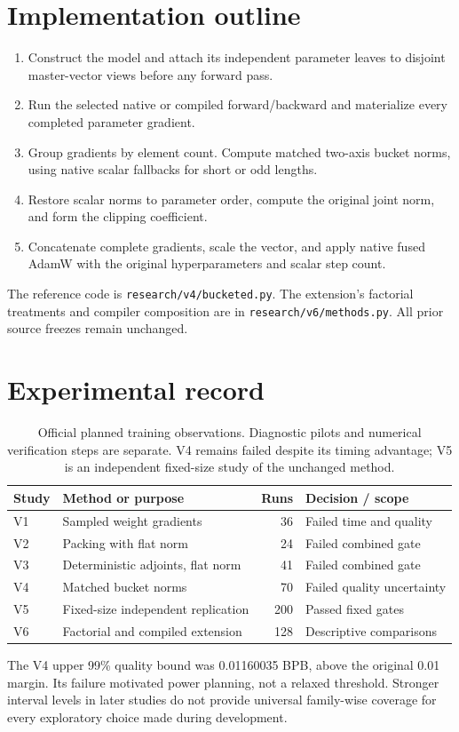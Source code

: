 \documentclass[11pt]{article}
\newcommand{\code}[1]{\texttt{#1}}
\begin{document}
\section{Implementation outline}
\begin{enumerate}
\item Construct the model and attach its independent parameter leaves to
disjoint master-vector views before any forward pass.
\item Run the selected native or compiled forward/backward and materialize
every completed parameter gradient.
\item Group gradients by element count. Compute matched two-axis bucket norms,
using native scalar fallbacks for short or odd lengths.
\item Restore scalar norms to parameter order, compute the original joint norm,
and form the clipping coefficient.
\item Concatenate complete gradients, scale the vector, and apply native fused
AdamW with the original hyperparameters and scalar step count.
\end{enumerate}
The reference code is \code{research/v4/bucketed.py}. The extension's factorial
treatments and compiler composition are in \code{research/v6/methods.py}.
All prior source freezes remain unchanged.

\section{Experimental record}
\begin{table}[H]
\centering
\small
\begin{tabular}{llrl}
\toprule
Study & Method or purpose & Runs & Decision / scope\\
\midrule
V1 & Sampled weight gradients & 36 & Failed time and quality\\
V2 & Packing with flat norm & 24 & Failed combined gate\\
V3 & Deterministic adjoints, flat norm & 41 & Failed combined gate\\
V4 & Matched bucket norms & 70 & Failed quality uncertainty\\
V5 & Fixed-size independent replication & 200 & Passed fixed gates\\
V6 & Factorial and compiled extension & 128 & Descriptive comparisons\\
\bottomrule
\end{tabular}
\caption{Official planned training observations. Diagnostic pilots and numerical
verification steps are separate. V4 remains failed despite its timing advantage;
V5 is an independent fixed-size study of the unchanged method.}
\end{table}
The V4 upper 99\% quality bound was 0.01160035 BPB, above the original 0.01
margin. Its failure motivated power planning, not a relaxed threshold. Stronger
interval levels in later studies do not provide universal family-wise coverage
for every exploratory choice made during development.
\end{document}
